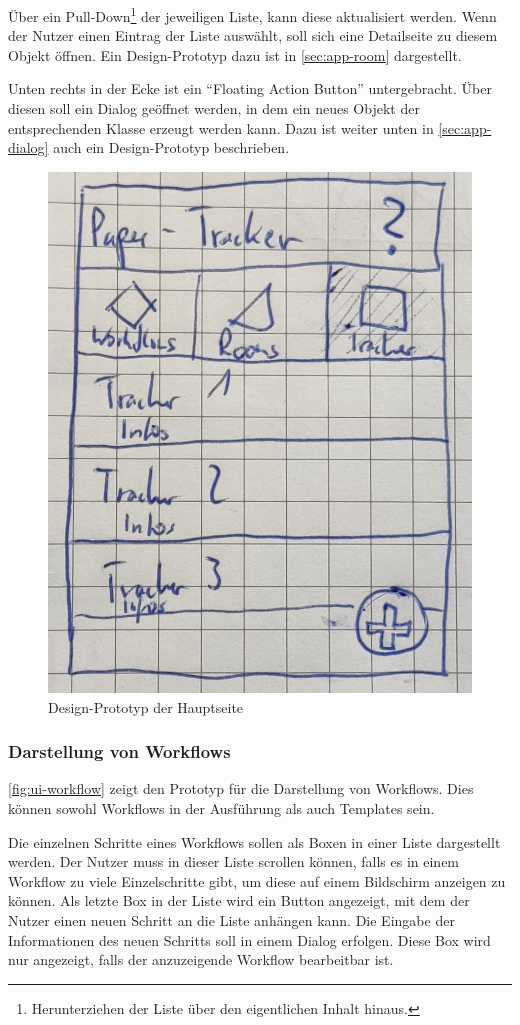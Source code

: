 Über ein Pull-Down\footnote{Herunterziehen der Liste über den eigentlichen Inhalt hinaus.} der jeweiligen Liste, kann diese aktualisiert werden.
Wenn der Nutzer einen Eintrag der Liste auswählt, soll sich eine Detailseite zu diesem Objekt öffnen.
Ein Design-Prototyp dazu ist in \autoref{sec:app-room} dargestellt.

Unten rechts in der Ecke ist ein \enquote{Floating Action Button} untergebracht.
Über diesen soll ein Dialog geöffnet werden, in dem ein neues Objekt der entsprechenden Klasse erzeugt werden kann.
Dazu ist weiter unten in \autoref{sec:app-dialog} auch ein Design-Prototyp beschrieben.

\begin{figure}[h!tbp]
	\includegraphics[width=.4\textwidth]{images/ui-prototype/main_page.jpg}
	\centering
	\caption{Design-Prototyp der Hauptseite}
	\label{fig:ui-main-page}
\end{figure}

\FloatBarrier

\subsubsection{Darstellung von Workflows}

\autoref{fig:ui-workflow} zeigt den Prototyp für die Darstellung von Workflows.
Dies können sowohl Workflows in der Ausführung als auch Templates sein.

Die einzelnen Schritte eines Workflows sollen als Boxen in einer Liste dargestellt werden.
Der Nutzer muss in dieser Liste scrollen können, falls es in einem Workflow zu viele Einzelschritte
gibt, um diese auf einem Bildschirm anzeigen zu können.
Als letzte Box in der Liste wird ein Button angezeigt, mit dem der Nutzer einen neuen Schritt an die Liste anhängen kann.
Die Eingabe der Informationen des neuen Schritts soll in einem Dialog erfolgen.
Diese Box wird nur angezeigt, falls der anzuzeigende Workflow bearbeitbar ist.

